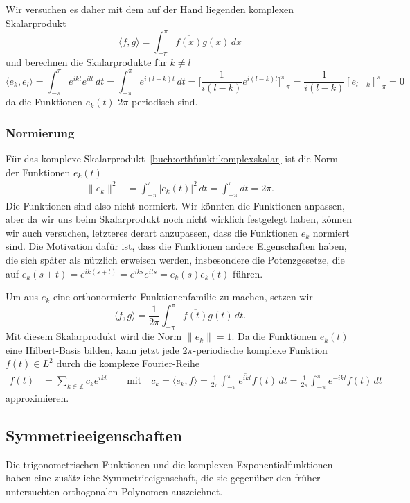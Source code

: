Wir versuchen es daher mit dem auf der Hand liegenden komplexen
Skalarprodukt
\begin{equation}
\langle f,g\rangle
=
\int_{-\pi}^\pi \overline{f(x)}g(x)\,dx
\label{buch:orthfunkt:komplexskalar}
\end{equation}
und berechnen die Skalarprodukte für $k\ne l$
\[
\langle e_k,e_l\rangle
=
\int_{-\pi}^\pi \overline{e^{ikt}} e^{ilt}\,dt
=
\int_{-\pi}^\pi e^{i(l-k)t}\,dt
=
\biggl[
\frac{1}{i(l-k)} e^{i(l-k)t}
\biggr]_{-\pi}^\pi
=
\frac{1}{i(l-k)}
[ e_{l-k} ]_{-\pi}^\pi
=
0
\]
da die Funktionen $e_k(t)$ $2\pi$-periodisch sind.

%
%
\subsubsection{Normierung}
Für das komplexe Skalarprodukt~\eqref{buch:orthfunkt:komplexskalar}
ist die Norm der Funktionen $e_k(t)$
\begin{align*}
\|e_k\|^2
&=
\int_{-\pi}^\pi |e_k(t)|^2\,dt
=
\int_{-\pi}^\pi dt
=
2\pi.
\end{align*}
Die Funktionen sind also nicht normiert.
Wir könnten die Funktionen anpassen, aber da wir uns beim Skalarprodukt
noch nicht wirklich festgelegt haben, können wir auch versuchen, letzteres
derart anzupassen, dass die Funktionen $e_k$ normiert sind.
Die Motivation dafür ist, dass die Funktionen andere Eigenschaften haben,
die sich später als nützlich erweisen werden, insbesondere die 
Potenzgesetze, die auf $e_k(s+t)=e^{ik(s+t)}=e^{iks}e^{its}=e_k(s)e_k(t)$
führen.

Um aus $e_k$ eine orthonormierte Funktionenfamilie zu machen, 
setzen wir
\begin{equation}
\langle f,g\rangle
=
\frac{1}{2\pi}
\int_{-\pi}^\pi \overline{f(t)} g(t)\,dt.
\end{equation}
Mit diesem Skalarprodukt wird die Norm $\|e_k\|=1$.
Da die Funktionen $e_k(t)$ eine Hilbert-Basis bilden, kann jetzt jede
$2\pi$-periodische komplexe Funktion $f(t)\in L^2$ durch die komplexe
Fourier-Reihe
\begin{align*}
f(t)
&=
\sum_{k\in\mathbb{Z}} c_k e^{ikt}
\qquad\text{mit}\quad
c_k
=
\langle e_k,f\rangle
=
\frac{1}{2\pi}
\int_{-\pi}^{\pi}  \overline{e^{ikt}} f(t)\,dt
=
\frac{1}{2\pi}
\int_{-\pi}^{\pi}  e^{-ikt} f(t)\,dt
\end{align*}
approximieren.

%
%
\subsection{Symmetrieeigenschaften
\label{buch:trigo:subsection:symmetrie}}
Die trigonometrischen Funktionen und die komplexen Exponentialfunktionen
haben eine zusätzliche Symmetrieeigenschaft, die sie gegenüber den früher
untersuchten orthogonalen Polynomen auszeichnet.


